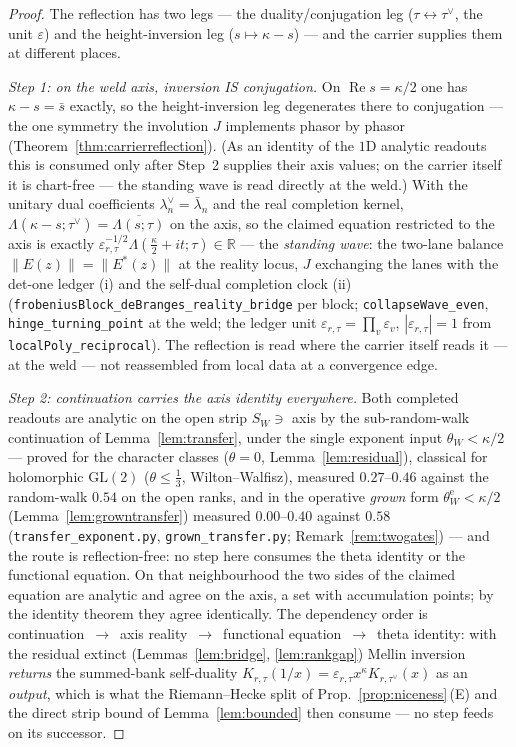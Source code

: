 \documentclass[11pt]{article}
\theoremstyle{definition}
\renewcommand{\Re}{\operatorname{Re}}
\begin{document}
\begin{proof}
The reflection has two legs --- the duality/conjugation leg ($\tau\leftrightarrow\tau^\vee$, the unit
$\varepsilon$) and the height-inversion leg ($s\mapsto\kappa-s$) --- and the carrier supplies them at
different places.

\emph{Step 1: on the weld axis, inversion IS conjugation.} On $\Re s=\kappa/2$ one has $\kappa-s=\bar s$
exactly, so the height-inversion leg degenerates there to conjugation --- the one symmetry the involution $J$
implements phasor by phasor (Theorem~\ref{thm:carrierreflection}). (As an identity of the $1$D analytic
readouts this is consumed only after Step~2 supplies their axis values; on the carrier itself it is chart-free
--- the standing wave is read directly at the weld.) With the unitary dual coefficients
$\lambda_n^{\vee}=\bar\lambda_n$ and the real completion kernel,
$\Lambda(\kappa-s;\tau^\vee)=\overline{\Lambda(s;\tau)}$ on the axis, so the claimed equation restricted to
the axis is exactly $\varepsilon_{r,\tau}^{-1/2}\Lambda(\tfrac\kappa2+it;\tau)\in\mathbb R$ --- the
\emph{standing wave}: the two-lane balance $\|E(z)\|=\|E^{*}(z)\|$ at the reality locus, $J$ exchanging the
lanes with the det-one ledger \textup{(i)} and the self-dual completion clock \textup{(ii)}
(\texttt{frobeniusBlock\_deBranges\_reality\_bridge} per block; \texttt{collapseWave\_even},
\texttt{hinge\_turning\_point} at the weld; the ledger unit $\varepsilon_{r,\tau}=\prod_v\varepsilon_v$,
$|\varepsilon_{r,\tau}|=1$ from \texttt{localPoly\_reciprocal}). The reflection is read where the carrier
itself reads it --- at the weld --- not reassembled from local data at a convergence edge.

\emph{Step 2: continuation carries the axis identity everywhere.} Both completed readouts are analytic on the
open strip $S_W\ni$ axis by the sub-random-walk continuation of Lemma~\ref{lem:transfer}, under the single
exponent input $\theta_W<\kappa/2$ --- proved for the character classes ($\theta=0$,
Lemma~\ref{lem:residual}), classical for holomorphic $\mathrm{GL}(2)$ ($\theta\le\tfrac13$, Wilton--Walfisz),
measured $0.27$--$0.46$ against the random-walk $0.54$ on the open ranks, and in the operative \emph{grown}
form $\theta^{\mathrm e}_W<\kappa/2$ (Lemma~\ref{lem:growntransfer}) measured $0.00$--$0.40$ against $0.58$
(\texttt{transfer\_exponent.py}, \texttt{grown\_transfer.py}; Remark~\ref{rem:twogates}) --- and the route is
reflection-free: no step here consumes the theta identity or the functional equation. On that neighbourhood
the two sides of the claimed equation are analytic and agree on the axis, a set with accumulation points; by
the identity theorem they agree identically. The dependency order is
continuation~$\to$~axis reality~$\to$~functional equation~$\to$~theta identity: with the residual extinct
(Lemmas~\ref{lem:bridge}, \ref{lem:rankgap}) Mellin inversion \emph{returns} the summed-bank self-duality
$K_{r,\tau}(1/x)=\varepsilon_{r,\tau}x^{\kappa}K_{r,\tau^\vee}(x)$ as an \emph{output}, which is what the
Riemann--Hecke split of Prop.~\ref{prop:niceness}\,(E) and the direct strip bound of Lemma~\ref{lem:bounded}
then consume --- no step feeds on its successor.


\end{proof}
\end{document}
